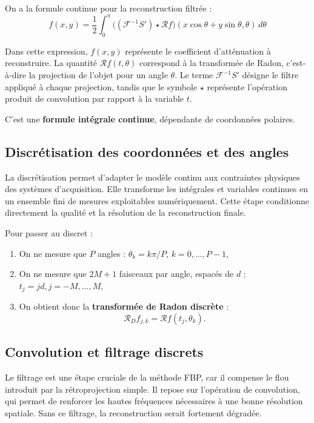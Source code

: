 On a la formule continue pour la reconstruction filtrée :
\begin{equation}
f(x,y) = \frac{1}{2} \int_0^\pi \Big( (\mathcal{F}^{-1} S') \star \mathcal{R} f \Big)(x\cos\theta + y\sin\theta, \theta) \, d\theta
\end{equation}

Dans cette expression, $f(x,y)$ représente le coefficient d'atténuation à reconstruire. La quantité $\mathcal{R}f(t,\theta)$ correspond à la transformée de Radon, c'est-à-dire la projection de l'objet pour un angle $\theta$. Le terme $\mathcal{F}^{-1}S'$ désigne le filtre appliqué à chaque projection, tandis que le symbole $\star$ représente l'opération produit de convolution par rapport à la variable $t$.

C'est une \textbf{formule intégrale continue}, dépendante de coordonnées polaires.
\subsection{Discrétisation des coordonnées et des angles}
La discrétisation permet d'adapter le modèle continu aux contraintes physiques des systèmes d'acquisition. Elle transforme les intégrales et variables continues en un ensemble fini de mesures exploitables numériquement. Cette étape conditionne directement la qualité et la résolution de la reconstruction finale. 

Pour passer au discret :
\begin{enumerate}
    \item On ne mesure que $P$ angles : $\theta_k = k\pi/P$, $k = 0,\dots,P-1$,
    \item On ne mesure que $2M+1$ faisceaux par angle, espacés de $d$ : $t_j = j d, j=-M,\dots,M$,
    \item On obtient donc la \textbf{transformée de Radon discrète} :
    \begin{equation}
    \mathcal{R}_D f_{j,k} = \mathcal{R} f(t_j, \theta_k).
    \end{equation}
\end{enumerate}

\subsection{Convolution et filtrage discrets}
Le filtrage est une étape cruciale de la méthode FBP, car il compense le flou introduit par la rétroprojection simple. Il repose sur l'opération de convolution, qui permet de renforcer les hautes fréquences nécessaires à une bonne résolution spatiale. Sans ce filtrage, la reconstruction serait fortement dégradée.

